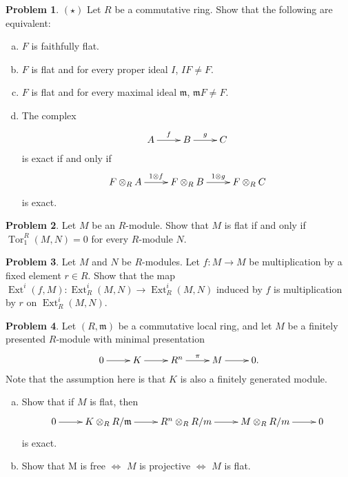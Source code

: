 \documentclass[11pt]{article}
\DeclareMathOperator{\Tor}{Tor}
\DeclareMathOperator{\Ext}{Ext}
\newcommand{\m}{\mathfrak{m}}
\theoremstyle{definition}
\newtheorem{problem}{Problem}
\begin{document}
\vspace{2em}

\noindent
{} 

\vspace{0.5em}

\begin{problem} 
$(\star)$ Let $R$ be a commutative ring.
Show that the following are equivalent:	
\begin{enumerate}[a)]
		\item $F$ is faithfully flat.
		\item $F$ is flat and for every proper ideal $I$, $IF \neq F$.
		\item $F$ is flat and for every maximal ideal $\m$, $\m F \neq F$.
		\item The complex
		$$\xymatrix{A \ar[r]^-f & B \ar[r]^-g & C}$$
		is exact if and only if 
		$$\xymatrix{F \otimes_R A \ar[r]^-{1 \otimes f} & F \otimes_R B \ar[r]^-{1 \otimes g} & F \otimes_R C}$$ 
		is exact.
	\end{enumerate}
\end{problem}


\vfill



\begin{problem}
Let $M$ be an $R$-module. Show that $M$ is flat if and only if $\Tor_1^R(M,N) = 0$ for every $R$-module $N$.
\end{problem}



\vfill
	
\begin{problem}
Let $M$ and $N$ be $R$-modules. Let $f\!: M \to M$ be multiplication by a fixed element $r \in R$. Show that the map $\Ext^i(f,M)\!: \Ext^i_R(M,N) \to \Ext^i_R(M,N)$ induced by $f$ is multiplication by $r$ on $\Ext^i_R(M,N)$.
\end{problem}




\vfill


\newpage

\begin{problem}
Let $(R, \m)$ be a commutative local ring, and let $M$ be a finitely presented $R$-module with minimal presentation
$$\xymatrix{0 \ar[r] & K \ar[r] & R^n \ar[r]^-\pi & M \ar[r] & 0.}$$
Note that the assumption here is that $K$ is also a finitely generated module.
\begin{enumerate}[a)]
	\item Show that if $M$ is flat, then
$$\xymatrix{0 \ar[r] & K \otimes_R R/\m \ar[r] & R^n \otimes_R R/m \ar[r] & M \otimes_R R/m \ar[r] & 0}$$
is exact.
\item Show that 
	  M is free $\iff$ $M$ is projective $\iff$ $M$ is flat.
\end{enumerate}
\end{problem}
\end{document}
